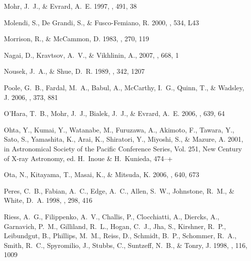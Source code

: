 \documentclass[apj]{emulateapj}
\begin{document}
\begin{thebibliography}{}
{Mohr}, J.~J., \& {Evrard}, A.~E. 1997, \apj, 491, 38

{Molendi}, S., {De Grandi}, S., \& {Fusco-Femiano}, R. 2000, \apjl, 534, L43

{Morrison}, R., \& {McCammon}, D. 1983, \apj, 270, 119

{Nagai}, D., {Kravtsov}, A.~V., \& {Vikhlinin}, A., 2007, \apj, 668,
  1

{Nousek}, J.~A., \& {Shue}, D.~R. 1989, \apj, 342, 1207

{Poole}, G.~B., {Fardal}, M.~A., {Babul}, A., {McCarthy}, I.~G.,
  {Quinn}, T., \& {Wadsley}, J. 2006, \mnras, 373, 881

{O'Hara}, T.~B., {Mohr}, J.~J., {Bialek}, J.~J., \& {Evrard}, A.~E. 2006, \apj,
  639, 64

{Ohta}, Y., {Kumai}, Y., {Watanabe}, M., {Furuzawa}, A., {Akimoto}, F.,
  {Tawara}, Y., {Sato}, S., {Yamashita}, K., {Arai}, K., {Shiratori}, Y.,
  {Miyoshi}, S., \& {Mazure}, A. 2001, in Astronomical Society of the Pacific
  Conference Series, Vol. 251, New Century of X-ray Astronomy, ed. H.~{Inoue}
  \& H.~{Kunieda}, 474--+

{Ota}, N., {Kitayama}, T., {Masai}, K., \& {Mitsuda}, K. 2006, \apj, 640, 673

{Peres}, C.~B., {Fabian}, A.~C., {Edge}, A.~C., {Allen}, S.~W., {Johnstone},
  R.~M., \& {White}, D.~A. 1998, \mnras, 298, 416

{Riess}, A.~G., {Filippenko}, A.~V., {Challis}, P., {Clocchiatti}, A.,
  {Diercks}, A., {Garnavich}, P.~M., {Gilliland}, R.~L., {Hogan}, C.~J., {Jha},
  S., {Kirshner}, R.~P., {Leibundgut}, B., {Phillips}, M.~M., {Reiss}, D.,
  {Schmidt}, B.~P., {Schommer}, R.~A., {Smith}, R.~C., {Spyromilio}, J.,
  {Stubbs}, C., {Suntzeff}, N.~B., \& {Tonry}, J. 1998, \aj, 116, 1009


\end{thebibliography}
\end{document}

